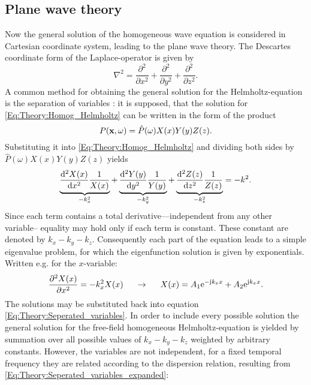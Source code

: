 \subsection{Plane wave theory}
Now the general solution of the homogeneous wave equation is considered in Cartesian coordinate system, leading to the plane wave theory.
The Descartes coordinate form of the Laplace-operator is given by
\begin{equation}
\nabla^2 = \frac{\partial^2}{\partial x^2} + \frac{\partial^2}{\partial y^2} +  \frac{\partial^2}{\partial z^2}.
\end{equation}
A common method for obtaining the general solution for the Helmholtz-equation is the separation of variables \cite{Devaney2012}: 
it is supposed, that the solution for \eqref{Eq:Theory:Homog_Helmholtz} can be written in the form of the product
\begin{equation}
P(\mathbf{x},\omega) = \hat{P}(\omega) X(x)Y(y)Z(z).
\label{Eq:Theory:Seperated_variables}
\end{equation}
Substituting it into \eqref{Eq:Theory:Homog_Helmholtz} and dividing both sides by $\hat{P}(\omega) X(x)Y(y)Z(z)$ yields
\begin{equation}
\underbrace{\frac{\mathrm{d}^2 X(x)}{\mathrm{d} x^2}\frac{1}{X(x)}}_{-k_x^2} + 
\underbrace{\frac{\mathrm{d}^2 Y(y)}{\mathrm{d} y^2}\frac{1}{Y(y)}}_{-k_y^2} + 
\underbrace{\frac{\mathrm{d}^2 Z(z)}{\mathrm{d} z^2}\frac{1}{Z(z)}}_{-k_z^2}
= - k^2.
\label{Eq:Theory:Seperated_variables_expanded}
\end{equation}
Since each term contains a total derivative---independent from any other variable-- equality may hold only if each term is constant. 
These constant are denoted by $k_x-k_y-k_z$. 
Consequently each part of the equation leads to a simple eigenvalue problem, for which the eigenfunction solution is given by exponentials. 
Written e.g. for the $x$-variable:
\begin{equation}
\frac{\partial^2 X(x)}{\partial x^2} = -k_x^2 X(x) \hspace{5mm} \rightarrow \hspace{5mm} X(x) = A_1 \mathrm{e}^{-\mathrm{j} k_x x} + A_2 \mathrm{e}^{\mathrm{j} k_x x}.
\end{equation}
The solutions may be substituted back into equation \eqref{Eq:Theory:Seperated_variables}. 
In order to include every possible solution the general solution for the free-field homogeneous Helmholtz-equation is yielded by summation over all possible values of $k_x-k_y-k_z$ weighted by arbitrary constants. 
However, the variables are not independent, for a fixed temporal frequency they are related according to the dispersion relation, resulting from \eqref{Eq:Theory:Seperated_variables_expanded}:
